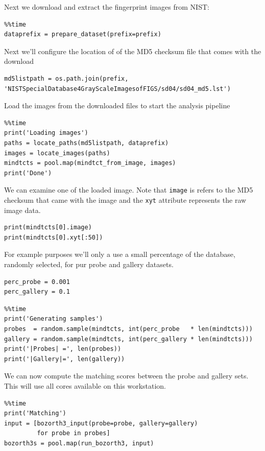 Next we download and extract the fingerprint images from NIST:

\begin{verbatim}
%%time
dataprefix = prepare_dataset(prefix=prefix)
\end{verbatim}

Next we'll configure the location of of the MD5 checksum file that comes
with the download

\begin{verbatim}
md5listpath = os.path.join(prefix, 'NISTSpecialDatabase4GrayScaleImagesofFIGS/sd04/sd04_md5.lst')
\end{verbatim}

Load the images from the downloaded files to start the analysis pipeline

\begin{verbatim}
%%time
print('Loading images')
paths = locate_paths(md5listpath, dataprefix)
images = locate_images(paths)
mindtcts = pool.map(mindtct_from_image, images)
print('Done')
\end{verbatim}

We can examine one of the loaded image. Note that \texttt{image} is
refers to the MD5 checksum that came with the image and the \texttt{xyt}
attribute represents the raw image data.

\begin{verbatim}
print(mindtcts[0].image)
print(mindtcts[0].xyt[:50])
\end{verbatim}

For example purposes we'll only a use a small percentage of the
database, randomly selected, for pur probe and gallery datasets.

\begin{verbatim}
perc_probe = 0.001
perc_gallery = 0.1
\end{verbatim}

\begin{verbatim}
%%time
print('Generating samples')
probes  = random.sample(mindtcts, int(perc_probe   * len(mindtcts)))
gallery = random.sample(mindtcts, int(perc_gallery * len(mindtcts)))
print('|Probes| =', len(probes))
print('|Gallery|=', len(gallery))
\end{verbatim}

We can now compute the matching scores between the probe and gallery
sets. This will use all cores available on this workstation.

\begin{verbatim}
%%time
print('Matching')
input = [bozorth3_input(probe=probe, gallery=gallery)
         for probe in probes]
bozorth3s = pool.map(run_bozorth3, input)
\end{verbatim}

